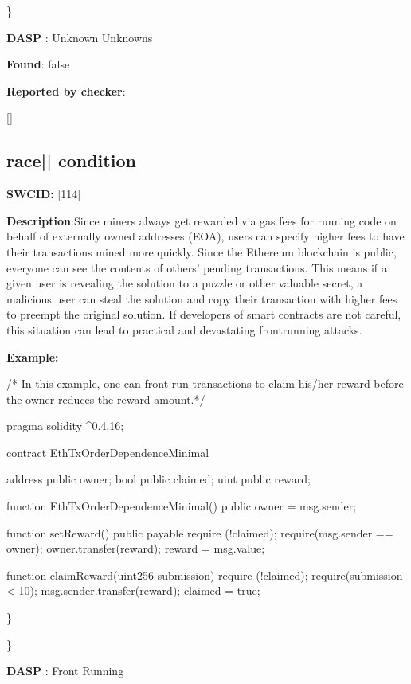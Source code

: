 \documentclass{article}
\begin{document}
\} 

\textbf{DASP} : Unknown Unknowns

\textbf{Found}: false

\textbf{Reported by checker}: 
\begin{ffcode} 

[]
\end{ffcode} 
\subsection{race{|\textunderscore| }condition} 
\textbf{SWC{\textunderscore }ID:} [114]

\textbf{Description}:Since miners always get rewarded via gas fees for running code on behalf of externally owned addresses (EOA), users can specify higher fees to have their transactions mined more quickly. Since the Ethereum blockchain is public, everyone can see the contents of others' pending transactions. This means if a given user is revealing the solution to a puzzle or other valuable secret, a malicious user can steal the solution and copy their transaction with higher fees to preempt the original solution. If developers of smart contracts are not careful, this situation can lead to practical and devastating front{\textendash}running attacks.


\textbf{Example:} 
\begin{ffcode} 

/* In this example, one can front-run transactions to claim his/her reward before the owner reduces the reward amount.*/ 

pragma solidity ^0.4.16;

contract EthTxOrderDependenceMinimal {
    address public owner;
    bool public claimed;
    uint public reward;

    function EthTxOrderDependenceMinimal() public {
        owner = msg.sender;
    }

    function setReward() public payable {
        require (!claimed);
        require(msg.sender == owner);
        owner.transfer(reward);
        reward = msg.value;
    }

    function claimReward(uint256 submission) {
        require (!claimed);
        require(submission < 10);
        msg.sender.transfer(reward);
        claimed = true;
    }
}

\end{ffcode} 
\} 

\} 

\textbf{DASP} : Front Running
\end{document}
